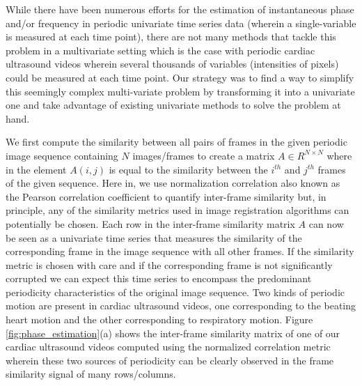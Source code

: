 \documentclass[runningheads,a4paper]{llncs}
\begin{document}
%
While there have been numerous efforts for the estimation of instantaneous phase and/or frequency in periodic univariate time series data (wherein a single-variable is measured at each time point)\cite{Boashash1992,Lu2013,Luo2003}, there are not many methods that tackle this problem in a multivariate setting which is the case with periodic cardiac ultrasound videos wherein several thousands of variables (intensities of pixels) could be measured at each time point. Our strategy was to find a way to simplify this seemingly complex multi-variate problem by transforming it into a univariate one and take advantage of existing univariate methods to solve the problem at hand. 

	We first compute the similarity between all pairs of frames in the given periodic image sequence containing $N$ images/frames to create a matrix $A \in R^{N \times N}$ where in the element $A(i,j)$ is equal to the similarity between the $i^{th}$ and $j^{th}$ frames of the given sequence. Here in, we use normalization correlation also known as the Pearson correlation coefficient to quantify inter-frame similarity but, in principle, any of the similarity metrics used in image registration algorithms \cite{Goshtasby2012} can potentially be chosen. Each row in the inter-frame similarity matrix $A$ can now be seen as a univariate time series that measures the similarity of the corresponding frame in the image sequence with all other frames. If the similarity metric is chosen with care and if the corresponding frame is not significantly corrupted we can expect this time series to encompass the predominant periodicity characteristics of the original image sequence. Two kinds of periodic motion are present in cardiac ultrasound videos, one corresponding to the beating heart motion and the other corresponding to respiratory motion. Figure \ref{fig:phase_estimation}(a) shows the inter-frame similarity matrix of one of our cardiac ultrasound videos computed using the normalized correlation metric wherein these two sources of periodicity can be clearly observed in the frame similarity signal of many rows/columns. 
\end{document}
